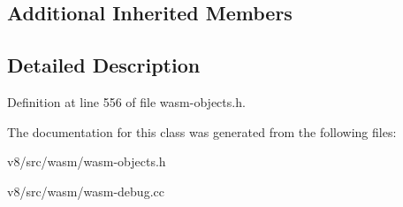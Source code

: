 \subsection*{Additional Inherited Members}


\subsection{Detailed Description}


Definition at line 556 of file wasm-\/objects.\+h.



The documentation for this class was generated from the following files\+:\begin{DoxyCompactItemize}
\item 
v8/src/wasm/wasm-\/objects.\+h\item 
v8/src/wasm/wasm-\/debug.\+cc\end{DoxyCompactItemize}
